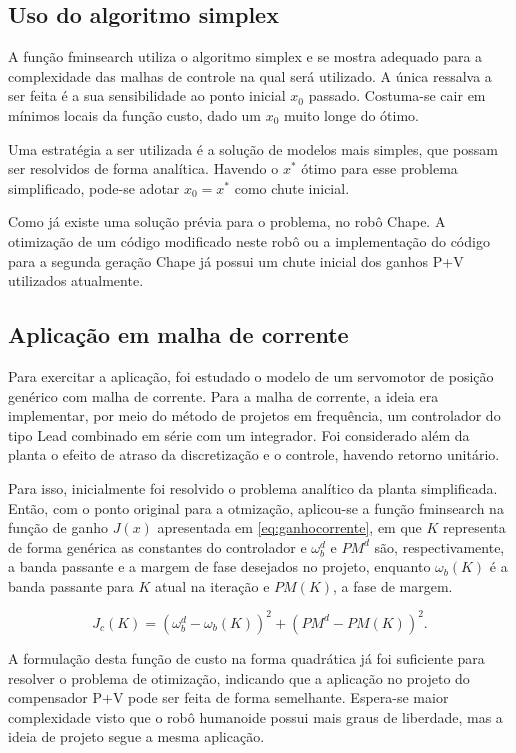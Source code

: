 \subsection{Uso do algoritmo simplex}

A função fminsearch utiliza o algoritmo simplex e se mostra adequado para a complexidade das malhas de controle na qual será utilizado. A única ressalva a ser feita é a sua sensibilidade ao ponto inicial $x_0$ passado. Costuma-se cair em mínimos locais da função custo, dado um $x_0$ muito longe do ótimo.

Uma estratégia a ser utilizada é a solução de modelos mais simples, que possam ser resolvidos de forma analítica. Havendo o $x^*$ ótimo para esse problema simplificado, pode-se adotar $x_0 = x^*$ como chute inicial.

Como já existe uma solução prévia para o problema, no robô Chape. A otimização de um código modificado neste robô ou a implementação do código para a segunda geração Chape já possui um chute inicial dos ganhos P+V utilizados atualmente.

\subsection{Aplicação em malha de corrente}

Para exercitar a aplicação, foi estudado o modelo de um servomotor de posição genérico \cite{max27} com malha de corrente. Para a malha de corrente, a ideia era implementar, por meio do método de projetos em frequência, um controlador do tipo Lead combinado em série com um integrador. Foi considerado além da planta o efeito de atraso da discretização e o controle, havendo retorno unitário.

Para isso, inicialmente foi resolvido o problema analítico da planta simplificada. Então, com o ponto original para a otmização, aplicou-se a função fminsearch na função de ganho $J(x)$ apresentada em \eqref{eq:ganhocorrente}, em que $K$ representa de forma genérica as constantes do controlador e $\omega_b^d$ e $PM^d$ são, respectivamente, a banda passante e a margem de fase desejados no projeto, enquanto $\omega_b(K)$ é a banda passante para $K$ atual na iteração  e $PM(K)$, a fase de margem.

\begin{equation}
\label{eq:ganhocorrente}
J_c(K) = (\omega_b^d - \omega_b(K))^2+(PM^d-PM(K))^2.
\end{equation}

A formulação desta função de custo na forma quadrática já foi suficiente para resolver o problema de otimização, indicando que a aplicação no projeto do compensador P+V pode ser feita de forma semelhante. Espera-se maior complexidade visto que o robô humanoide possui mais graus de liberdade, mas a ideia de projeto segue a mesma aplicação.

